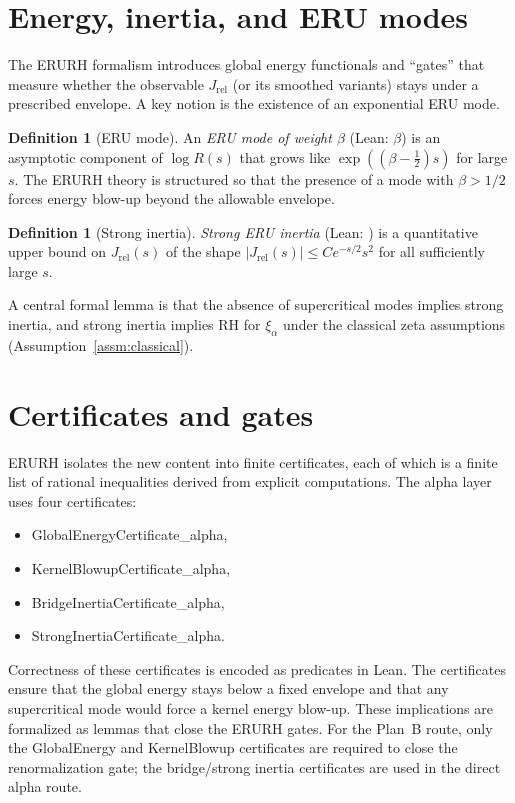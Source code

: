 \documentclass[11pt]{article}
\theoremstyle{plain}
\theoremstyle{definition}
\newtheorem{definition}[theorem]{Definition}
\newcommand{\code}[1]{\path{#1}}
\begin{document}
\section{Energy, inertia, and ERU modes}
The ERURH formalism introduces global energy functionals and ``gates'' that
measure whether the observable $J_{\mathrm{rel}}$ (or its smoothed variants)
stays under a prescribed envelope. A key notion is the existence of an
exponential ERU mode.

\begin{definition}[ERU mode]
An \emph{ERU mode of weight $\beta$} (Lean: \code{ERU_mode_beta} $\beta$) is
an asymptotic component of $\log R(s)$ that grows like
$\exp((\beta-\tfrac{1}{2})s)$ for large $s$. The ERURH theory is structured so
that the presence of a mode with $\beta>1/2$ forces energy blow-up beyond the
allowable envelope.
\end{definition}

\begin{definition}[Strong inertia]
\emph{Strong ERU inertia} (Lean: \code{InertiaERU_alpha_strong}) is a
quantitative upper bound on $J_{\mathrm{rel}}(s)$ of the shape
$|J_{\mathrm{rel}}(s)| \le C e^{-s/2}s^2$ for all sufficiently large $s$.
\end{definition}

A central formal lemma is that the absence of supercritical modes implies
strong inertia, and strong inertia implies RH for $\xi_\alpha$ under the
classical zeta assumptions (Assumption~\ref{assm:classical}).

\section{Certificates and gates}
ERURH isolates the new content into finite certificates, each of which is a
finite list of rational inequalities derived from explicit computations.
The alpha layer uses four certificates:
\begin{itemize}
  \item GlobalEnergyCertificate\_alpha,
  \item KernelBlowupCertificate\_alpha,
  \item BridgeInertiaCertificate\_alpha,
  \item StrongInertiaCertificate\_alpha.
\end{itemize}
Correctness of these certificates is encoded as predicates in Lean. The
certificates ensure that the global energy stays below a fixed envelope and
that any supercritical mode would force a kernel energy blow-up. These
implications are formalized as lemmas that close the ERURH gates.
For the Plan~B route, only the GlobalEnergy and KernelBlowup certificates are
required to close the renormalization gate; the bridge/strong inertia
certificates are used in the direct alpha route.
\end{document}

